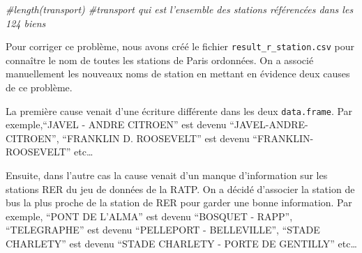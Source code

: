 \documentclass[french,]{article}
\newenvironment{Shaded}{\begin{snugshade}}{\end{snugshade}}
\newcommand{\CommentTok}[1]{\textcolor[rgb]{0.56,0.35,0.01}{\textit{#1}}}
\begin{document}
\begin{Shaded}
\begin{Highlighting}[]
\CommentTok{#length(transport) #transport qui est l'ensemble des stations référencées dans les 124 biens}
\end{Highlighting}
\end{Shaded}

Pour corriger ce problème, nous avons créé le fichier
\texttt{result\_r\_station.csv} pour connaître le nom de toutes les
stations de Paris ordonnées. On a associé manuellement les nouveaux noms
de station en mettant en évidence deux causes de ce problème.

La première cause venait d'une écriture différente dans les deux
\texttt{data.frame}. Par exemple,``JAVEL - ANDRE CITROEN'' est devenu
``JAVEL-ANDRE-CITROEN'', ``FRANKLIN D. ROOSEVELT'' est devenu
``FRANKLIN-ROOSEVELT'' etc\ldots{}

Ensuite, dans l'autre cas la cause venait d'un manque d'information sur
les stations RER du jeu de données de la RATP. On a décidé d'associer la
station de bus la plus proche de la station de RER pour garder une bonne
information. Par exemple, ``PONT DE L'ALMA'' est devenu ``BOSQUET -
RAPP'', ``TELEGRAPHE'' est devenu ``PELLEPORT - BELLEVILLE'', ``STADE
CHARLETY'' est devenu ``STADE CHARLETY - PORTE DE GENTILLY'' etc\ldots{}
\end{document}
